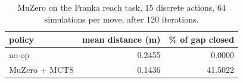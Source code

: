 \begin{table}[t]
\centering
\begin{tabular}{lrr}
\toprule
policy & mean distance (m) & \% of gap closed \\
\midrule
no-op & 0.2455 & 0.0000 \\
MuZero + MCTS & 0.1436 & 41.5022 \\
\bottomrule
\end{tabular}
\caption{MuZero on the Franka reach task, 15 discrete actions, 64 simulations per move, after 120 iterations.}
\label{tab:muzero-franka}
\end{table}

